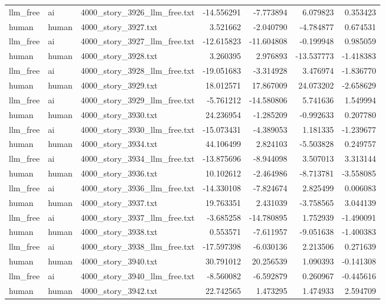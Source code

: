 \begin{longtable}{lllrrrr}
llm\_free & ai & 4000\_story\_3926\_llm\_free.txt & -14.556291 & -7.773894 & 6.079823 & 0.353423 \\
human & human & 4000\_story\_3927.txt & 3.521662 & -2.040790 & -4.784877 & 0.674531 \\
llm\_free & ai & 4000\_story\_3927\_llm\_free.txt & -12.615823 & -11.604808 & -0.199948 & 0.985059 \\
human & human & 4000\_story\_3928.txt & 3.260395 & 2.976893 & -13.537773 & -1.418383 \\
llm\_free & ai & 4000\_story\_3928\_llm\_free.txt & -19.051683 & -3.314928 & 3.476974 & -1.836770 \\
human & human & 4000\_story\_3929.txt & 18.012571 & 17.867009 & 24.073202 & -2.658629 \\
llm\_free & ai & 4000\_story\_3929\_llm\_free.txt & -5.761212 & -14.580806 & 5.741636 & 1.549994 \\
human & human & 4000\_story\_3930.txt & 24.236954 & -1.285209 & -0.992633 & 0.207780 \\
llm\_free & ai & 4000\_story\_3930\_llm\_free.txt & -15.073431 & -4.389053 & 1.181335 & -1.239677 \\
human & human & 4000\_story\_3934.txt & 44.106499 & 2.824103 & -5.503828 & 0.249757 \\
llm\_free & ai & 4000\_story\_3934\_llm\_free.txt & -13.875696 & -8.944098 & 3.507013 & 3.313144 \\
human & human & 4000\_story\_3936.txt & 10.102612 & -2.464986 & -8.713781 & -3.558085 \\
llm\_free & ai & 4000\_story\_3936\_llm\_free.txt & -14.330108 & -7.824674 & 2.825499 & 0.006083 \\
human & human & 4000\_story\_3937.txt & 19.763351 & 2.431039 & -3.758565 & 3.044139 \\
llm\_free & ai & 4000\_story\_3937\_llm\_free.txt & -3.685258 & -14.780895 & 1.752939 & -1.490091 \\
human & human & 4000\_story\_3938.txt & 0.553571 & -7.611957 & -9.051638 & -1.400383 \\
llm\_free & ai & 4000\_story\_3938\_llm\_free.txt & -17.597398 & -6.030136 & 2.213506 & 0.271639 \\
human & human & 4000\_story\_3940.txt & 30.791012 & 20.256539 & 1.090393 & -0.141308 \\
llm\_free & ai & 4000\_story\_3940\_llm\_free.txt & -8.560082 & -6.592879 & 0.260967 & -0.445616 \\
human & human & 4000\_story\_3942.txt & 22.742565 & 1.473295 & 1.474933 & 2.594709 \\

\end{longtable}
